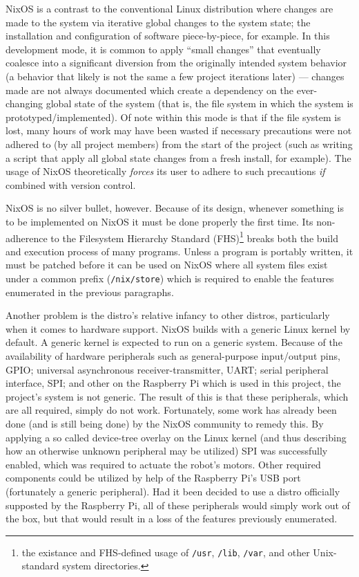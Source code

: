 NixOS is a contrast to the conventional Linux distribution where changes are made to the system via iterative global changes to the system state;
the installation and configuration of software piece-by-piece, for example.
In this development mode, it is common to apply ``small changes'' that eventually coalesce into a significant diversion from the originally intended system behavior (a behavior that likely is not the same a few project iterations later) ---
changes made are not always documented which create a dependency on the ever-changing global state of the system (that is, the file system in which the system is prototyped/implemented).
Of note within this mode is that if the file system is lost,
many hours of work may have been wasted if necessary precautions were not adhered to (by all project members) from the start of the project (such as writing a script that apply all global state changes from a fresh install, for example).
The usage of NixOS theoretically \textit{forces} its user to adhere to such precautions \textit{if} combined with version control.

NixOS is no silver bullet, however.
Because of its design, whenever something is to be implemented on NixOS it must be done properly the first time.
Its non-adherence to the Filesystem Hierarchy Standard (FHS)\footnote{the existance and FHS-defined usage of \texttt{/usr}, \texttt{/lib}, \texttt{/var}, and other Unix-standard system directories.} breaks both the build and execution process of many programs.
Unless a program is portably written, it must be patched before it can be used on NixOS where all system files exist under a common prefix (\texttt{/nix/store}) which is required to enable the features enumerated in the previous paragraphs.

Another problem is the distro's relative infancy to other distros, particularly when it comes to hardware support.
NixOS builds with a generic Linux kernel by default.
A generic kernel is expected to run on a generic system.
Because of the availability of hardware peripherals such as general-purpose input/output pins, GPIO;
universal asynchronous receiver-transmitter, UART;
serial peripheral interface, SPI; and other on the Raspberry Pi which is used in this project, the project's system is not generic.
The result of this is that these peripherals, which are all required, simply do not work.
Fortunately, some work has already been done (and is still being done) by the NixOS community to remedy this.
By applying a so called device-tree overlay on the Linux kernel (and thus describing how an otherwise unknown peripheral may be utilized) SPI was successfully enabled,
which was required to actuate the robot's motors.
Other required components could be utilized by help of the Raspberry Pi's USB port (fortunately a generic peripheral).
Had it been decided to use a distro officially supposted by the Raspberry Pi,
all of these peripherals would simply work out of the box,
but that would result in a loss of the features previously enumerated.

